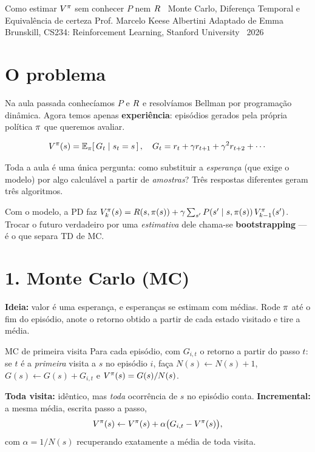 \documentclass[11pt, a4paper]{article}
\begin{document}
     {Como estimar $V^{\pi}$ sem conhecer $P$ nem $R$ \textbullet\ Monte Carlo, Diferença Temporal e Equivalência de certeza}
     {Prof. Marcelo Keese Albertini}
     {Adaptado de Emma Brunskill, CS234: Reinforcement Learning, Stanford University \textbullet\ 2026}


\section{O problema}

Na aula passada conhecíamos $P$ e $R$ e resolvíamos Bellman por programação
dinâmica. Agora temos apenas \textbf{experiência}: episódios gerados pela
própria política $\pi$ que queremos avaliar.

\[
  V^{\pi}(s) = \mathbb{E}_{\pi}\!\left[\,G_t \mid s_t = s\,\right],
  \quad G_t = r_t + \gamma r_{t+1} + \gamma^2 r_{t+2} + \cdots
\]

\begin{ideiabox}
  Toda a aula é uma única pergunta: como substituir a \emph{esperança}
  (que exige o modelo) por algo calculável a partir de \emph{amostras}?
  Três respostas diferentes geram três algoritmos.
\end{ideiabox}

Com o modelo, a PD faz $V_k^{\pi}(s) = R(s,\pi(s)) + \gamma\sum_{s'}
P(s'\mid s,\pi(s))\,V_{k-1}^{\pi}(s')$. Trocar o futuro verdadeiro por uma
\emph{estimativa} dele chama-se \textbf{bootstrapping} — é o que separa TD de MC.

\section{1. Monte Carlo (MC)}

\textbf{Ideia:} valor é uma esperança, e esperanças se estimam com médias.
Rode $\pi$ até o fim do episódio, anote o retorno obtido a partir de cada
estado visitado e tire a média.

\begin{algbox}{MC de primeira visita}
  Para cada episódio, com $G_{i,t}$ o retorno a partir do passo $t$:
  se $t$ é a \emph{primeira} visita a $s$ no episódio $i$, faça
  $N(s)\!\leftarrow\!N(s)+1$, $G(s)\!\leftarrow\!G(s)+G_{i,t}$ e
  $V^{\pi}(s) = G(s)/N(s)$.
\end{algbox}

\textbf{Toda visita:} idêntico, mas \emph{toda} ocorrência de $s$ no episódio
conta. \textbf{Incremental:} a mesma média, escrita passo a passo,
\[
  V^{\pi}(s) \leftarrow V^{\pi}(s) + \alpha\bigl(G_{i,t} - V^{\pi}(s)\bigr),
\]
com $\alpha = 1/N(s)$ recuperando exatamente a média de toda visita.
\end{document}
